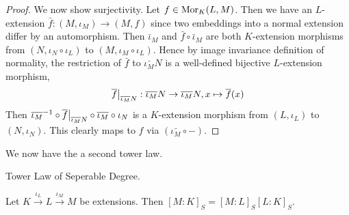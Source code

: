 \documentclass[../book.tex]{subfiles}
\begin{document}
\begin{proof}
    We now show surjectivity. 
    Let $f \in \text{Mor}_{K}(L, M)$. 
    Then we have an $L$-extension $\bar{f} : (M,\iota_M) \to (M,f)$
    since two embeddings into a normal extension differ by an automorphism. 
    Then $\bar\iota_M$ and $\bar{f}\circ\bar\iota_M$ are
    both $K$-extension morphisms from
    $(N,\iota_N\circ\iota_L)$ to $(M,\iota_M\circ\iota_L)$.
    Hence by image invariance definition of normality, 
    the restriction of $\bar{f}$ to $\bar{\iota_M} N$ is 
    a well-defined bijective $L$-extension morphism, \[
        \res{\bar{f}}{\bar{\iota_M} N} : \bar{\iota_M} N \to \bar{\iota_M} N,
        x \mapsto \bar{f}(x)
    \]
    Then $\bar{\iota_M}^{-1} \circ \res{\bar{f}}{\bar{\iota_M}N} 
    \circ \bar{\iota_M} \circ \iota_N $ is a $K$-extension morphism
    from $(L,\iota_L)$ to $(N,\iota_N)$. 
    This clearly maps to $f$ via $(\bar{\iota_M} \circ -)$. 
\end{proof}
We now have the a second tower law. 
\begin{thm} Tower Law of Seperable Degree. 
    
    Let $K \overset{\iota_L}{\to} L \overset{\iota_M}{\to} M$ be extensions.
    Then $[M : K]_S = [M : L]_S [L : K]_S$.
\end{thm}
\end{document}
